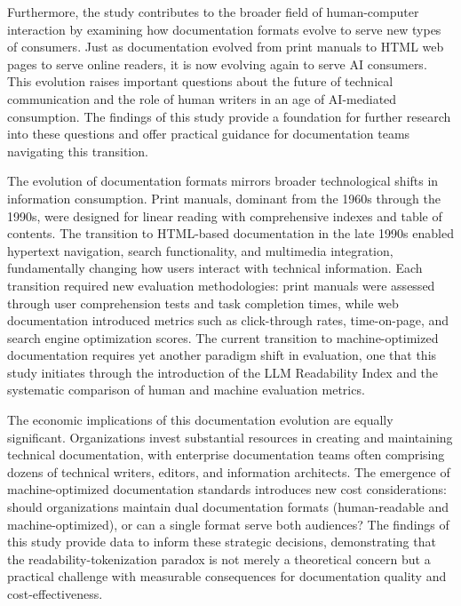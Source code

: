 \documentclass[10pt,conference,a4paper]{IEEEtran}
\begin{document}
Furthermore, the study contributes to the broader field of human-computer interaction by examining how documentation formats evolve to serve new types of consumers. Just as documentation evolved from print manuals to HTML web pages to serve online readers, it is now evolving again to serve AI consumers. This evolution raises important questions about the future of technical communication and the role of human writers in an age of AI-mediated consumption. The findings of this study provide a foundation for further research into these questions and offer practical guidance for documentation teams navigating this transition.

The evolution of documentation formats mirrors broader technological shifts in information consumption. Print manuals, dominant from the 1960s through the 1990s, were designed for linear reading with comprehensive indexes and table of contents. The transition to HTML-based documentation in the late 1990s enabled hypertext navigation, search functionality, and multimedia integration, fundamentally changing how users interact with technical information. Each transition required new evaluation methodologies: print manuals were assessed through user comprehension tests and task completion times, while web documentation introduced metrics such as click-through rates, time-on-page, and search engine optimization scores. The current transition to machine-optimized documentation requires yet another paradigm shift in evaluation, one that this study initiates through the introduction of the LLM Readability Index and the systematic comparison of human and machine evaluation metrics.

The economic implications of this documentation evolution are equally significant. Organizations invest substantial resources in creating and maintaining technical documentation, with enterprise documentation teams often comprising dozens of technical writers, editors, and information architects. The emergence of machine-optimized documentation standards introduces new cost considerations: should organizations maintain dual documentation formats (human-readable and machine-optimized), or can a single format serve both audiences? The findings of this study provide data to inform these strategic decisions, demonstrating that the readability-tokenization paradox is not merely a theoretical concern but a practical challenge with measurable consequences for documentation quality and cost-effectiveness.

\end{document}
